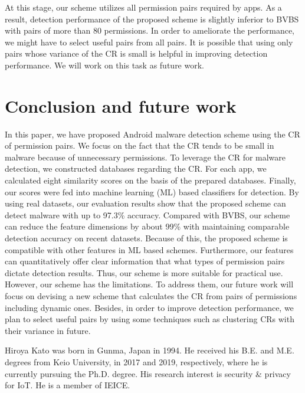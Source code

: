 \documentclass{ieeeaccess}
\begin{document}
At this stage, our scheme utilizes all permission pairs required by apps.
As a result, detection performance of the proposed scheme is slightly inferior to BVBS with pairs of more than 80 permissions.
In order to ameliorate the performance, we might have to select useful pairs from all pairs.
It is possible that using only pairs whose variance of the CR is small is helpful in improving detection performance.
We will work on this task as future work.

\section{Conclusion and future work} \label{sec:conclusion}
In this paper, we have proposed Android malware detection scheme using the CR of permission pairs.  
We focus on the fact that the CR tends to be small in malware because of unnecessary permissions.
To leverage the CR for malware detection, we constructed databases regarding the CR.
For each app, we calculated eight similarity scores on the basis of the prepared databases.
Finally, our scores were fed into machine learning (ML) based classifiers for detection.
By using real datasets, our evaluation results show that the proposed scheme can detect malware with up to 97.3\% accuracy.
Compared with BVBS, our scheme can reduce the feature dimensions by about 99\% with maintaining comparable detection accuracy on recent datasets.
Because of this, the proposed scheme is compatible with other features in ML based schemes.
Furthermore, our features can quantitatively offer clear information that what types of permission pairs dictate detection results.
Thus, our scheme is more suitable for practical use.
However, our scheme has the limitations.
To address them, our future work will focus on devising a new scheme that calculates the CR from pairs of permissions including dynamic ones.
Besides, in order to improve detection performance, we plan to select useful pairs by using some techniques such as clustering CRs with their variance in future.



\begin{IEEEbiography}{Hiroya Kato} was born in Gunma, Japan in 1994. He received his B.E. and M.E. degrees from Keio University, in 2017 and 2019, respectively, where he is currently pursuing the Ph.D. degree. His research interest is security \& privacy for IoT. He is a member of IEICE.
\end{IEEEbiography} 
\end{document}
